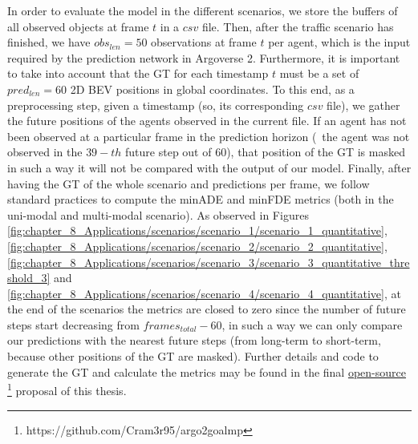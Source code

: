 In order to evaluate the model in the different scenarios, we store the buffers of all observed objects at frame $t$ in a $csv$ file. Then, after the traffic scenario has finished, we have $obs_{len}=50$ observations at frame $t$ per agent, which is the input required by the prediction network in Argoverse 2. Furthermore, it is important to take into account that the \ac{GT} for each timestamp $t$ must be a set of $pred_{len}=60$ 2D \ac{BEV} positions in global coordinates. To this end, as a preprocessing step, given a timestamp (so, its corresponding $csv$ file), we gather the future positions of the agents observed in the current file. If an agent has not been observed at a particular frame in the prediction horizon (\ie \ the agent was not observed in the $39-th$ future step out of 60), that position of the \ac{GT} is masked in such a way it will not be compared with the output of our model. Finally, after having the \ac{GT} of the whole scenario and predictions per frame, we follow standard practices to compute the \ac{minADE} and \ac{minFDE} metrics (both in the uni-modal and multi-modal scenario). As observed in Figures \ref{fig:chapter_8_Applications/scenarios/scenario_1/scenario_1_quantitative}, \ref{fig:chapter_8_Applications/scenarios/scenario_2/scenario_2_quantitative}, \ref{fig:chapter_8_Applications/scenarios/scenario_3/scenario_3_quantitative_threshold_3} and \ref{fig:chapter_8_Applications/scenarios/scenario_4/scenario_4_quantitative}, at the end of the scenarios the metrics are closed to zero since the number of future steps start decreasing from $frames_{total}-60$, in such a way we can only compare our predictions with the nearest future steps (from long-term to short-term, because other positions of the \ac{GT} are masked). Further details and code to generate the \ac{GT} and calculate the metrics may be found in the final \href{https://github.com/Cram3r95/argo2goalmp}{open-source} \footnote{https://github.com/Cram3r95/argo2goalmp} proposal of this thesis.  


